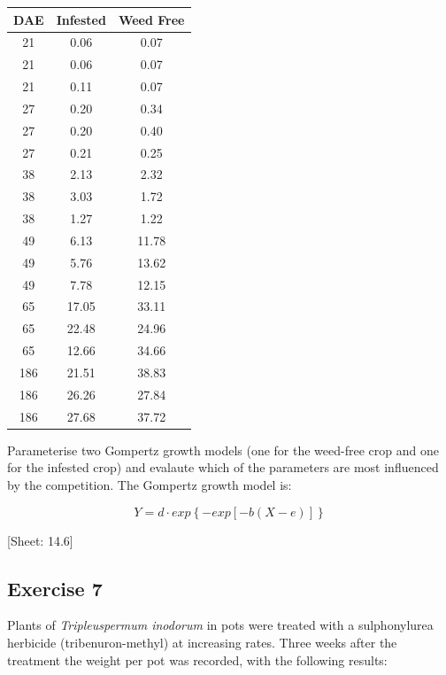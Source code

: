 \documentclass[a4paper,12pt,oneside]{book}
\begin{document}
\begin{longtable}[]{@{}ccc@{}}
\toprule
DAE & Infested & Weed Free \\
\midrule
\endhead
21 & 0.06 & 0.07 \\
21 & 0.06 & 0.07 \\
21 & 0.11 & 0.07 \\
27 & 0.20 & 0.34 \\
27 & 0.20 & 0.40 \\
27 & 0.21 & 0.25 \\
38 & 2.13 & 2.32 \\
38 & 3.03 & 1.72 \\
38 & 1.27 & 1.22 \\
49 & 6.13 & 11.78 \\
49 & 5.76 & 13.62 \\
49 & 7.78 & 12.15 \\
65 & 17.05 & 33.11 \\
65 & 22.48 & 24.96 \\
65 & 12.66 & 34.66 \\
186 & 21.51 & 38.83 \\
186 & 26.26 & 27.84 \\
186 & 27.68 & 37.72 \\
\bottomrule
\end{longtable}

Parameterise two Gompertz growth models (one for the weed-free crop and one for the infested crop) and evalaute which of the parameters are most influenced by the competition. The Gompertz growth model is:

\[Y = d \cdot exp\left\{- exp \left[ - b (X - e)\right] \right\}\]

{[}Sheet: 14.6{]}

\hypertarget{exercise-7-1}{%
\subsection{Exercise 7}\label{exercise-7-1}}

Plants of \emph{Tripleuspermum inodorum} in pots were treated with a sulphonylurea herbicide (tribenuron-methyl) at increasing rates. Three weeks after the treatment the weight per pot was recorded, with the following results:
\end{document}
